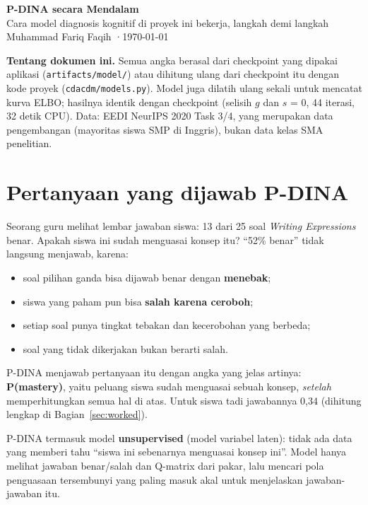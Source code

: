 \documentclass[11pt,a4paper]{article}
\begin{document}
\begin{center}
  {\LARGE\bfseries\color{navy} P-DINA secara Mendalam}\\[4pt]
  {\large Cara model diagnosis kognitif di proyek ini bekerja, langkah demi langkah}\\[6pt]
  {\small\color{midgray} Muhammad Fariq Faqih \quad·\quad \today}
\end{center}

\begin{intinya}
  \textbf{Tentang dokumen ini.} Semua angka berasal dari checkpoint yang dipakai aplikasi (\texttt{artifacts/model/})
  atau dihitung ulang dari checkpoint itu dengan kode proyek (\texttt{cdacdm/models.py}). Model juga dilatih ulang
  sekali untuk mencatat kurva ELBO; hasilnya identik dengan checkpoint (selisih $g$ dan $s$ = 0, 44 iterasi,
  32 detik CPU). Data: EEDI NeurIPS 2020 Task 3/4, yang merupakan data pengembangan (mayoritas siswa SMP di Inggris),
  bukan data kelas SMA penelitian.
\end{intinya}

\section{Pertanyaan yang dijawab P-DINA}

Seorang guru melihat lembar jawaban siswa: 13 dari 25 soal \emph{Writing Expressions} benar. Apakah siswa ini sudah
menguasai konsep itu? ``52\% benar'' tidak langsung menjawab, karena:
\begin{itemize}
  \item soal pilihan ganda bisa dijawab benar dengan \textbf{menebak};
  \item siswa yang paham pun bisa \textbf{salah karena ceroboh};
  \item setiap soal punya tingkat tebakan dan kecerobohan yang berbeda;
  \item soal yang tidak dikerjakan bukan berarti salah.
\end{itemize}
P-DINA menjawab pertanyaan itu dengan angka yang jelas artinya: \textbf{P(mastery)}, yaitu peluang siswa sudah
menguasai sebuah konsep, \emph{setelah} memperhitungkan semua hal di atas. Untuk siswa tadi jawabannya 0,34 (dihitung
lengkap di Bagian~\ref{sec:worked}).

P-DINA termasuk model \textbf{unsupervised} (model variabel laten): tidak ada data yang memberi tahu ``siswa ini
sebenarnya menguasai konsep ini''. Model hanya melihat jawaban benar/salah dan Q-matrix dari pakar, lalu mencari
pola penguasaan tersembunyi yang paling masuk akal untuk menjelaskan jawaban-jawaban itu.
\end{document}
